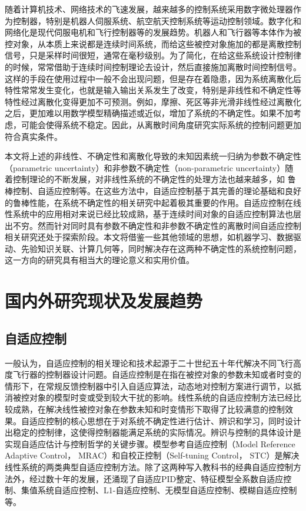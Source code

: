 随着计算机技术、网络技术的飞速发展，越来越多的控制系统采用数字微处理器作为控制器，特别是机器人伺服系统、航空航天控制系统等运动控制领域。数字化和网络化是现代伺服电机和飞行控制器等的发展趋势。机器人和飞行器等本体作为被控对象，从本质上来说都是连续时间系统，而给这些被控对象施加的都是离散控制信号，只是采样时间很短，通常在毫秒级别。为了简化，在给这些系统设计控制律的时候，常常借助于连续时间控制理论去设计，然后直接施加离散时间控制信号。这样的手段在使用过程中一般不会出现问题，但是存在着隐患，因为系统离散化后特性常常发生变化，也就是输入输出关系发生了改变，特别是非线性和不确定性等特性经过离散化变得更加不可预测。例如，摩擦、死区等非光滑非线性经过离散化之后，更加难以用数学模型精确描述或近似，增加了系统的不确定性。如果不加考虑，可能会使得系统不稳定。因此，从离散时间角度研究实际系统的控制问题更加符合真实条件。

本文将上述的非线性、不确定性和离散化导致的未知因素统一归纳为参数不确定性（parametric uncertainty）和非参数不确定性（non-parametric uncertainty）随着控制理论的不断发展，对非线性系统的不确定性的处理方法也越来越多，如 鲁棒控制、自适应控制等。在这些方法中，自适应控制基于其完善的理论基础和良好的鲁棒性能，在系统不确定性的相关研究中起着极其重要的作用。自适应控制在线性系统中的应用相对来说已经比较成熟，基于连续时间对象的自适应控制算法也层出不穷。然而针对同时具有参数不确定性和非参数不确定性的离散时间自适应控制相关研究还处于探索阶段。本文将借鉴一些其他领域的思想，如机器学习、数据驱动、先验知识关联、计算几何等，同时解决存在这两种不确定性的系统控制问题，这一方向的研究具有相当大的理论意义和实用价值。

\section{国内外研究现状及发展趋势}%

\subsection{自适应控制}%

一般认为，自适应控制的相关理论和技术起源于二十世纪五十年代解决不同飞行高度飞行器的控制器设计问题。自适应控制是在指在被控对象的参数未知或者时变的情形下，在常规反馈控制器中引入自适应算法，动态地对控制方案进行调节，以抵消被控对象的模型时变或受到较大干扰的影响。线性系统的自适应控制方法已经比较成熟，在解决线性被控对象在参数未知和时变情形下取得了比较满意的控制效果。自适应控制的核心思想在于对系统不确定性进行估计、辨识和学习，同时设计出稳定的控制律，这使得控制器能满足系统的实际情况。辨识与控制的具体设计是实现自适应估计与控制哲学的关键步骤。模型参考自适应控制（Model Reference Adaptive Control， MRAC）和自校正控制（Self-tuning Control， STC）是解决线性系统的两类典型自适应控制方法。除了这两种写入教科书的经典自适应控制方法外，经过数十年的发展，还涌现了自适应PID整定、特征模型全系数自适应控制、集值系统自适应控制、L1-自适应控制、无模型自适应控制、模糊自适应控制等。

